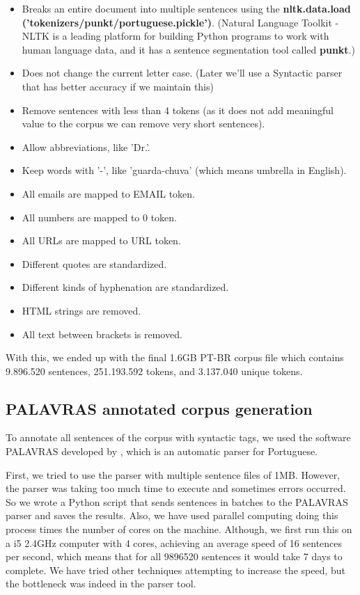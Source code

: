\begin{itemize}
    \item Breaks an entire document into multiple sentences using the 
    \textbf{nltk.data.load ('tokenizers/punkt/portuguese.pickle')}. (Natural Language Toolkit - NLTK is a leading platform for building Python programs to work with human language data, and it has a sentence segmentation tool called \textbf{punkt}.)
    \item Does not change the current letter case. (Later we'll use a Syntactic parser that has better accuracy if we maintain this)
    \item Remove sentences with less than 4 tokens (as it does not add meaningful value to the corpus we can remove very short sentences).
    \item Allow abbreviations, like 'Dr.'.
    \item Keep words with '-', like 'guarda-chuva' (which means umbrella in English).
    \item All emails are mapped to EMAIL token.
    \item All numbers are mapped to 0 token.
    \item All URLs are mapped to URL token.
    \item Different quotes are standardized.
    \item Different kinds of hyphenation are standardized.
    \item HTML strings are removed.
    \item All text between brackets is removed.
\end{itemize}

With this, we ended up with the final 1.6GB PT-BR corpus file which contains 9.896.520 sentences, 251.193.592 tokens, and 3.137.040 unique tokens.


\subsection{PALAVRAS annotated corpus generation}\label{chap:methodsandmaterials:palavras}

To annotate all sentences of the corpus with syntactic tags, we used the software PALAVRAS developed by , which is an automatic parser for Portuguese.

First, we tried to use the parser with multiple sentence files of 1MB. However, the parser was taking too much time to execute and sometimes errors occurred. So we wrote a Python script that sends sentences in batches to the PALAVRAS parser and saves the results. Also, we have used parallel computing doing this process times the number of cores on the machine. Although, we first run this on a i5 2.4GHz computer with 4 cores, achieving an average speed of 16 sentences per second, which means that for all 9896520 sentences it would take 7 days to complete. We have tried other techniques attempting to increase the speed, but the bottleneck was indeed in the parser tool. 

